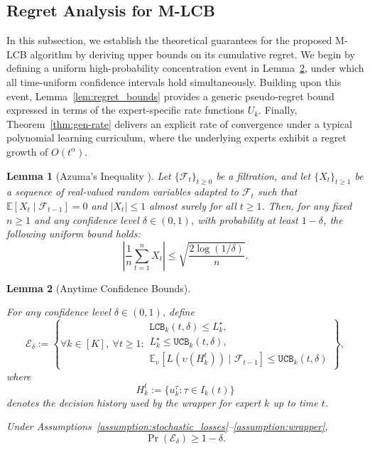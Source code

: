 \documentclass[a4paper,14pt]{extarticle}
\theoremstyle{plain}
\newtheorem{lemma}{Lemma}
\newcommand{\algname}[1]{{\textsf  #1}}
\newcommand{\LCB}{\texttt{LCB}}
\newcommand{\UCB}{\texttt{UCB}}
\begin{document}
\subsection{Regret Analysis for \algname{M-LCB}}
\label{sec:upper-bounds}

In this subsection, we establish the theoretical guarantees for the proposed \algname{M-LCB} algorithm by deriving upper bounds on its cumulative regret. We begin by defining a uniform high-probability concentration event in Lemma~\ref{prop:anytime-ci-clear}, under which all time-uniform confidence intervals hold simultaneously. Building upon this event, Lemma~\ref{lem:regret_bounds} provides a generic pseudo-regret bound expressed in terms of the expert-specific rate functions $U_k$. Finally, Theorem~\ref{thm:gen-rate} delivers an explicit rate of convergence under a typical polynomial learning curriculum, where the underlying experts exhibit a regret growth of $O(t^\alpha)$.

\begin{lemma}[Azuma's Inequality {\normalfont\cite[Theorem D.2]{mohri2018foundations}}]
\label{lemma:azuma_adaptive}
Let $\{\mathcal{F}_t\}_{t \ge 0}$ be a filtration, and let $\{X_t\}_{t \ge 1}$ be a sequence of real-valued random variables adapted to $\mathcal{F}_t$ such that $\mathbb{E}[X_t \mid \mathcal{F}_{t-1}] = 0$ and $|X_t| \le 1$ almost surely for all $t \ge 1$. Then, for any fixed $n \ge 1$ and any confidence level $\delta \in (0,1)$, with probability at least $1-\delta$, the following uniform bound holds:
\begin{equation}
\left|\frac{1}{n}\sum_{t=1}^n X_t\right| \le \sqrt{\frac{2\log(1/\delta)}{n}}.
\end{equation}
\end{lemma}

\begin{lemma}[Anytime Confidence Bounds]
\label{prop:anytime-ci-clear}

For any confidence level $\delta \in (0,1)$, define
\begin{equation}
\label{eq:conf_intervals}
\mathcal E_\delta :=
\left\{
\forall k\in[K],~\forall t\ge1:
\begin{array}{l}
\LCB_k(t,\delta)\le L_k^\star,\\
L_k^\star\le \UCB_k(t,\delta),\\
\mathbb E_\upsilon
    [L(\upsilon(H_k^t))
    \mid \mathcal F_{t-1}]
    \le \UCB_k(t,\delta)
\end{array}
\right\},
\end{equation}
where
\[
H_k^t:=\{u_k^\tau:\tau\in I_k(t)\}
\]
denotes the decision history used by the wrapper for expert $k$ up to time $t$.

Under Assumptions~\ref{assumption:stochastic_losses}--\ref{assumption:wrapper},
\[
\Pr(\mathcal E_\delta)\ge 1-\delta.
\]

\end{lemma}
\end{document}
